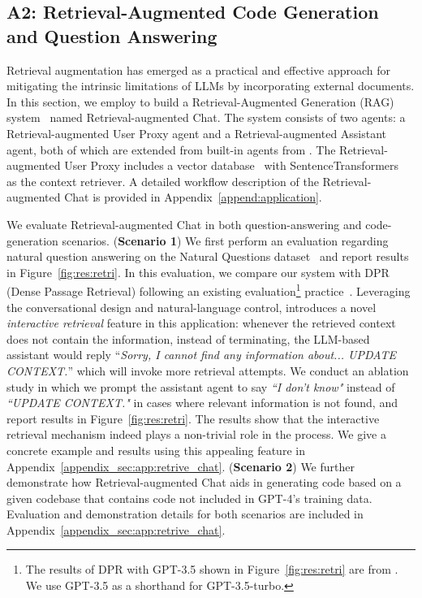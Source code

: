 \subsection*{A2: Retrieval-Augmented Code Generation and Question Answering} \label{sec:app:retrieve}


Retrieval augmentation has emerged as a practical and effective approach for mitigating the intrinsic limitations of LLMs by incorporating external documents.  
In this section, we employ \libName to build a Retrieval-Augmented Generation (RAG) system~\cite{lewis2020retrieval, parvez2021retrieval} named Retrieval-augmented Chat. 
The system consists of two agents: a Retrieval-augmented User Proxy agent and a Retrieval-augmented Assistant agent, both of which are extended from built-in agents from \libName. The Retrieval-augmented User Proxy includes a vector database~\cite{chromadb} with SentenceTransformers~\cite{reimers-2019-sentence-bert} as the context retriever. A detailed workflow description of the Retrieval-augmented Chat is provided in Appendix~\ref{append:application}.

We evaluate Retrieval-augmented Chat in both question-answering and code-generation scenarios. (\textbf{Scenario 1}) We first perform an evaluation regarding natural question answering on the Natural Questions dataset~\cite{kwiatkowski2019natural} and report results in Figure~\ref{fig:res:retri}. In this evaluation, we compare our system with DPR (Dense Passage
Retrieval) following an existing evaluation\footnote{The results of DPR with GPT-3.5 shown in Figure~\ref{fig:res:retri} are from \cite{adlakha2023evaluating}. We use GPT-3.5 as a shorthand for GPT-3.5-turbo.} practice~\cite{adlakha2023evaluating}. Leveraging the conversational design and natural-language control,  \libName introduces a novel \emph{interactive retrieval} feature in this application: whenever the retrieved context does not contain the information, instead of terminating, the LLM-based assistant would reply ``\emph{Sorry, I cannot find any
information about... UPDATE CONTEXT.}” which will invoke more retrieval attempts. We conduct an ablation study in which we prompt the assistant agent to say \emph{``I don't know"} instead of \emph{``UPDATE CONTEXT."} in cases where relevant information is not found, and report results in Figure~\ref{fig:res:retri}. The results show that the interactive retrieval mechanism indeed plays a non-trivial role in the process. We give a concrete example and results using this appealing feature in Appendix~\ref{appendix_sec:app:retrive_chat}. (\textbf{Scenario 2}) We further demonstrate how Retrieval-augmented Chat aids in generating code based on a given codebase that contains code not included in GPT-4's training data. Evaluation and demonstration details for both scenarios are included in Appendix~\ref{appendix_sec:app:retrive_chat}.  